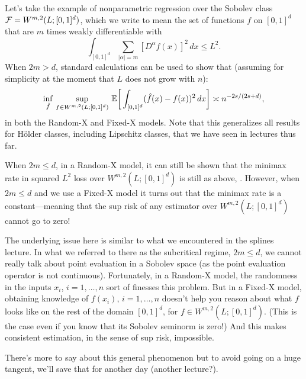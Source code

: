\documentclass{article}
\begin{document}
Let's take the example of nonparametric regression over the Sobolev class $\mathcal{F} =
W^{m,2}(L; [0,1]^d)$, which we write to mean the set of functions $f$ on
$[0,1]^d$ that are $m$ times weakly differentiable with   
\[
\int_{[0,1]^d} \sum_{|\alpha| = m} [D^\alpha f(x)]^2 \, dx \leq L^2.
\]
When $2m > d$, standard calculations can be used to show that (assuming for
simplicity at the moment that $L$ does not grow with $n$): 
\[
\inf_{\hat{f}} \, \sup_{f \in W^{m,2}(L; [0,1]^d)} \, \mathbb{E} \bigg[ \int_{[0,1]^d}
(\hat{f}(x) - f(x))^2 \, dx \bigg] \asymp n^{-2s/(2s+d)},
\]
in both the Random-X and Fixed-X models. Note that this generalizes all results
for H{\"o}lder classes, including Lipschitz classes, that we have seen in
lectures thus far.   

When $2m \leq d$, in a Random-X model, it can still be shown that the minimax
rate in squared $L^2$ loss over $W^{m,2}(L; [0,1]^d)$ is still as above,
. However, when $2m \leq d$ and we use a Fixed-X model
it turns out that the minimax rate is a constant---meaning that the sup risk of
any estimator over $W^{m,2}(L; [0,1]^d)$ cannot go to zero!

The underlying issue here is similar to what we encountered in the splines
lecture. In what we referred to there as the subcritical regime, $2m \leq d$, we
cannot really talk about point evaluation in a Sobolev space (as the point
evaluation operator is not continuous). Fortunately, in a Random-X model, the
randomness in the inputs $x_i$, $i=1,\dots,n$ sort of finesses this problem. But 
in a Fixed-X model, obtaining knowledge of $f(x_i)$, $i=1,\dots,n$ doesn't help
you reason about what $f$ looks like on the rest of the domain $[0,1]^d$, for $f
\in W^{m,2}(L; [0,1]^d)$. (This is the case even if you know that its Sobolev
seminorm is zero!) And this makes consistent estimation, in the sense of sup
risk, impossible. 

There's more to say about this general phenomenon but to avoid going on a huge
tangent, we'll save that for another day (another lecture?). 



\end{document}
